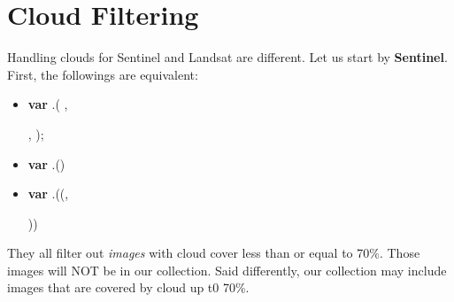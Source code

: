 \section{Cloud Filtering}
Handling clouds for Sentinel and Landsat are different. 
Let us start by \textbf{Sentinel}.\\

\noindent First, the followings are equivalent:

\begin{itemize}[leftmargin=0.5cm]
 \item  \textbf{var} .(
    ,

    \hspace{2.5in} , );
    
    \item \textbf{var} .()
    
    \item \textbf{var} .((, 
    
    \hspace{2.9in} ))
\end{itemize}
\noindent They all filter out \emph{images} 
with cloud cover less than or equal to 70\%.
Those images will NOT be in our 
 collection.
Said differently, 
our  
collection may include images that 
are covered by cloud up t0 70\%.

